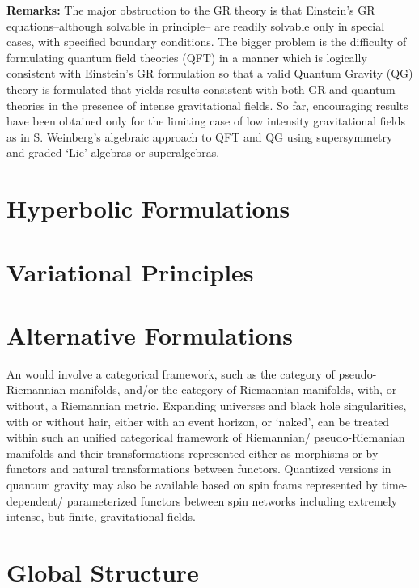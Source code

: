 \documentclass[12pt]{article}
\begin{document}
\textbf{Remarks:}
The major obstruction to the GR theory is that Einstein's GR equations--although solvable in principle--
are readily solvable only in special cases, with specified boundary conditions. The bigger
problem is the difficulty of formulating quantum field theories (QFT) in a manner
which is logically consistent with Einstein's GR formulation so that a valid Quantum Gravity (QG) theory
is formulated that yields results consistent with both GR and quantum theories in the presence of intense
gravitational fields. So far, encouraging results have been obtained only for the limiting case
of low intensity gravitational fields as in S. Weinberg's algebraic approach to QFT  and QG using supersymmetry and 
graded `Lie' algebras or superalgebras. 

\section{Hyperbolic Formulations}

\section{Variational Principles}

\section{Alternative Formulations}

 An 
 would involve a categorical framework, such as the category of pseudo-Riemannian manifolds, and/or the category of Riemannian manifolds, with, or without, a Riemannian metric. Expanding universes and black hole singularities,
with or without hair, either with an event horizon, or `naked', can be treated within
such an unified categorical framework of Riemannian/ pseudo-Riemanian manifolds and their 
transformations represented either as morphisms or by functors and natural transformations
between functors. Quantized versions in quantum gravity may also be available based on
spin foams represented by time-dependent/ parameterized functors between spin networks
including extremely intense, but finite, gravitational fields.  
\section{Global Structure}
\end{document}
